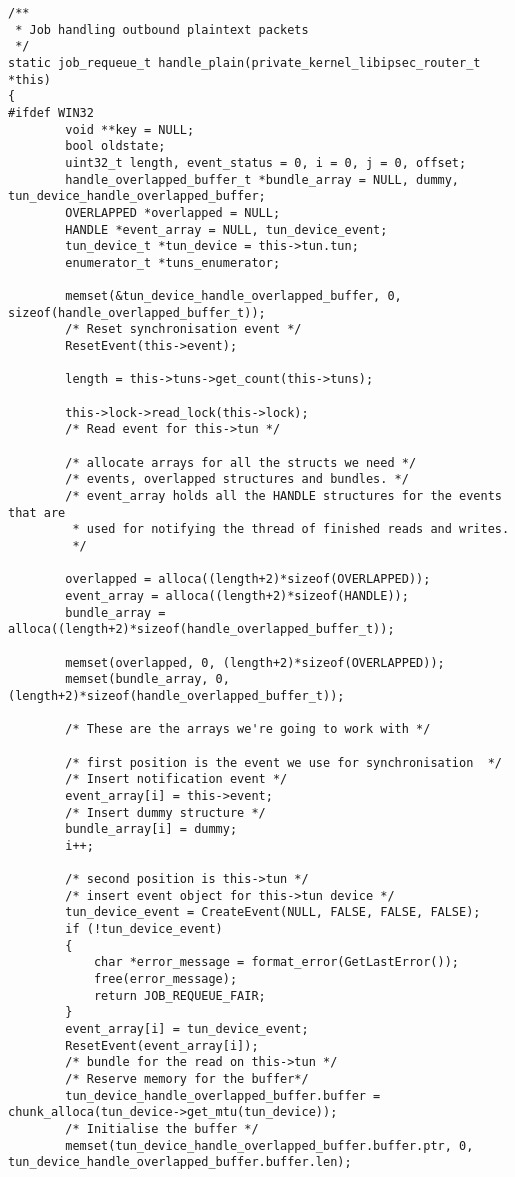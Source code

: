 \begin{lstlisting}[caption=Code für handle\_plain auf Windows,label=lst:handle-plain-windows]
/**
 * Job handling outbound plaintext packets
 */
static job_requeue_t handle_plain(private_kernel_libipsec_router_t *this)
{
#ifdef WIN32
        void **key = NULL;
        bool oldstate;
        uint32_t length, event_status = 0, i = 0, j = 0, offset;
        handle_overlapped_buffer_t *bundle_array = NULL, dummy, tun_device_handle_overlapped_buffer;
        OVERLAPPED *overlapped = NULL;
        HANDLE *event_array = NULL, tun_device_event;
        tun_device_t *tun_device = this->tun.tun;
        enumerator_t *tuns_enumerator;

        memset(&tun_device_handle_overlapped_buffer, 0, sizeof(handle_overlapped_buffer_t));
        /* Reset synchronisation event */
        ResetEvent(this->event);

        length = this->tuns->get_count(this->tuns);

        this->lock->read_lock(this->lock);
        /* Read event for this->tun */

        /* allocate arrays for all the structs we need */
        /* events, overlapped structures and bundles. */
        /* event_array holds all the HANDLE structures for the events that are
         * used for notifying the thread of finished reads and writes.
         */

        overlapped = alloca((length+2)*sizeof(OVERLAPPED));
        event_array = alloca((length+2)*sizeof(HANDLE));
        bundle_array = alloca((length+2)*sizeof(handle_overlapped_buffer_t));

        memset(overlapped, 0, (length+2)*sizeof(OVERLAPPED));
        memset(bundle_array, 0, (length+2)*sizeof(handle_overlapped_buffer_t));

        /* These are the arrays we're going to work with */

        /* first position is the event we use for synchronisation  */
        /* Insert notification event */
        event_array[i] = this->event;
        /* Insert dummy structure */
        bundle_array[i] = dummy;
        i++;

        /* second position is this->tun */
        /* insert event object for this->tun device */
        tun_device_event = CreateEvent(NULL, FALSE, FALSE, FALSE);
        if (!tun_device_event)
        {
            char *error_message = format_error(GetLastError());
            free(error_message);
            return JOB_REQUEUE_FAIR;
        }
        event_array[i] = tun_device_event;
        ResetEvent(event_array[i]);
        /* bundle for the read on this->tun */
        /* Reserve memory for the buffer*/
        tun_device_handle_overlapped_buffer.buffer = chunk_alloca(tun_device->get_mtu(tun_device));
        /* Initialise the buffer */
        memset(tun_device_handle_overlapped_buffer.buffer.ptr, 0, tun_device_handle_overlapped_buffer.buffer.len);


\end{lstlisting}
